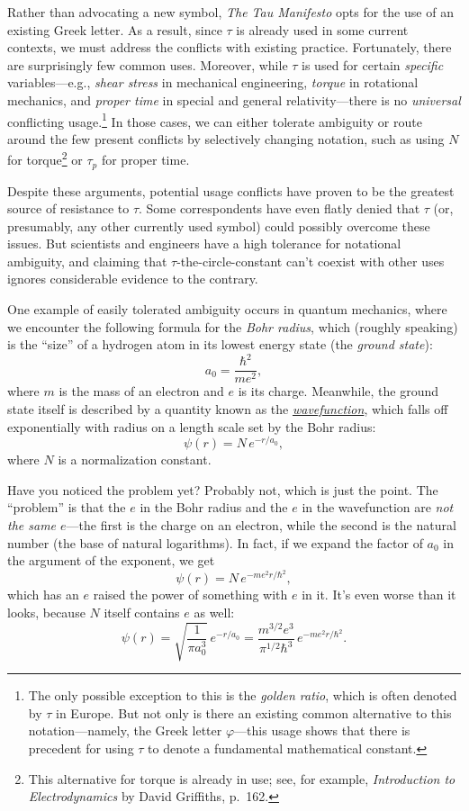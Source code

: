 Rather than advocating a new symbol, \emph{The Tau Manifesto} opts for the use of an existing Greek letter. As a result, since $\tau$ is already used in some current contexts, we must address the conflicts with existing practice. Fortunately, there are surprisingly few common uses. Moreover, while $\tau$ is used for certain \emph{specific} variables---e.g., \emph{shear stress} in mechanical engineering, \emph{torque} in rotational mechanics, and \emph{proper time} in special and general relativity---there is no \emph{universal} conflicting usage.\footnote{The only possible exception to this is the \emph{golden ratio}, which is often denoted by $\tau$ in Europe. But not only is there an existing common alternative to this notation---namely, the Greek letter $\varphi$---this usage shows that there is precedent for using $\tau$ to denote a fundamental mathematical constant.} In those cases, we can either tolerate ambiguity or route around the few present conflicts by selectively changing notation, such as using $N$ for torque\footnote{This alternative for torque is already in use; see, for example, \emph{Introduction to Electrodynamics} by David Griffiths, p.~162.} or $\tau_p$ for proper time.

Despite these arguments, potential usage conflicts have proven to be the greatest source of resistance to $\tau$. Some correspondents have even flatly denied that $\tau$ (or, presumably, any other currently used symbol) could possibly overcome these issues. But scientists and engineers have a high tolerance for notational ambiguity, and claiming that $\tau$-the-circle-constant can't coexist with other uses ignores considerable evidence to the contrary.

One example of easily tolerated ambiguity occurs in quantum mechanics, where we encounter the following formula for the \emph{Bohr radius}, which (roughly speaking) is the ``size'' of a hydrogen atom in its lowest energy state (the \emph{ground state}):
\[
a_0 = \frac{\hbar^2}{m e^2},
\]
where $m$ is the mass of an electron and $e$ is its charge. Meanwhile, the ground state itself is described by a quantity known as the \href{http://en.wikipedia.org/wiki/Wave_function}{\emph{wavefunction}}, which falls off exponentially with radius on a length scale set by the Bohr radius:
\[
\psi(r) = N\,e^{-r/a_0},
\]
where $N$ is a normalization constant.

Have you noticed the problem yet? Probably not, which is just the point. The ``problem'' is that the $e$ in the Bohr radius and the $e$ in the wavefunction are \emph{not the same $e$}---the first is the charge on an electron, while the second is the natural number (the base of natural logarithms). In fact, if we expand the factor of $a_0$ in the argument of the exponent, we get
\[
\psi(r) = N\,e^{-m e^2 r/\hbar^2},
\]
which has an $e$ raised the power of something with $e$ in it. It's even worse than it looks, because $N$ itself contains $e$ as well:
\[
\psi(r) = \sqrt{\frac{1}{\pi a_0^3}}\,e^{-r/a_0} =
\frac{m^{3/2} e^3}{\pi^{1/2} \hbar^3}\,e^{-m e^2 r/\hbar^2}.
\]

